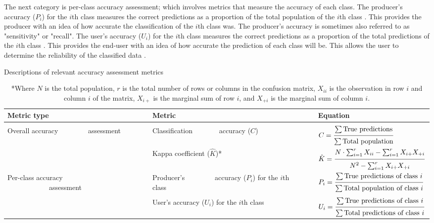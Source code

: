 \justify
The next category is per-class accuracy assessment; which involves metrics that measure the accuracy of each class. The producer's accuracy ($P_i$) for the $i$th class measures the correct predictions as a proportion of the total population of the $i$th class \citep{banko1998}. This provides the producer with an idea of how accurate the classification of the $i$th class was. The producer's accuracy is sometimes also referred to as "sensitivity" or "recall". The user's accuracy ($U_i$) for the $i$th class measures the correct predictions as a proportion of the total predictions of the $i$th class \citep{banko1998}. This provides the end-user with an idea of how accurate the prediction of each class will be. This allows the user to determine the reliability of the classified data \citep{banko1998}.

\begin{table}[H]
	\centering
	\small
	\def\arraystretch{1.5}
	\begin{threeparttable}
		\caption{Descriptions of relevant accuracy assessment metrics}
		\label{table9}
		\begin{tabular}{L{4cm} L{0.05cm} L{3cm} L{0.8cm} L{6cm}}
			\toprule[0.25mm]
			Metric type && Metric && Equation\\
			\midrule[0.35mm]\\[-0.5cm]
			Overall accuracy ~~~~~~~~assessment && Classification ~~~~~~~accuracy ($C$) &&   \\\\[0.15cm]
			&& Kappa coefficient ($\hat{K}$)* &&    \\\\[0.15cm]
			Per-class accuracy ~~~~~~~~~~~~assessment && Producer's ~~~~~~~~accuracy ($P_i$) for the $i$th class && \\\\[-0.2cm]
			&& User's accuracy ($U_i$) for the $i$th class &&   \\\\[-0.3cm]
			\bottomrule[0.25mm]
		\end{tabular}
		\vspace{5pt}
		\caption*{*Where $N$ is the total population, $r$ is the total number of rows or columns in the confusion matrix, $X_{ii}$ is the observation in row $i$ and column $i$ of the matrix, $X_{i+}$ is the marginal sum of row $i$, and $X_{+i}$ is the marginal sum of column $i$.}
	\end{threeparttable}
\end{table}
\vspace{-0.9cm}

